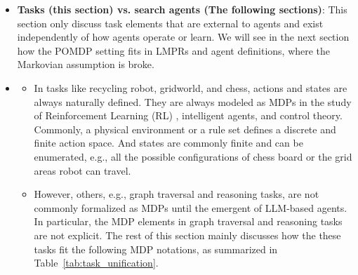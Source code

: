 \begin{itemize}

    \item \textbf{Tasks (this section) vs. search agents (The following sections)}: This section only discuss task elements that are external to agents and exist independently of how agents operate or learn. We will see in the next section how the POMDP setting fits in LMPRs and agent definitions, where the Markovian assumption is broke.

    \item {}
    \begin{itemize}
        \item {} In tasks like recycling robot, gridworld, and chess, actions and states are always naturally defined. They are always modeled as MDPs in the study of Reinforcement Learning (RL) \citep{sutton2018reinforcement}, intelligent agents, and control theory. Commonly, a physical environment or a rule set defines a discrete and finite action space. And states are commonly finite and can be enumerated, e.g., all the possible configurations of chess board or the grid areas robot can travel. 

        \item {}
        However, others, e.g., graph traversal and reasoning tasks, are not commonly formalized as MDPs until the emergent of LLM-based agents. In particular, the MDP elements in graph traversal and reasoning tasks are not explicit.
        The rest of this section mainly discusses how the these tasks fit the following MDP notations, as summarized in Table~\ref{tab:task_unification}.
    \end{itemize}
\end{itemize}


